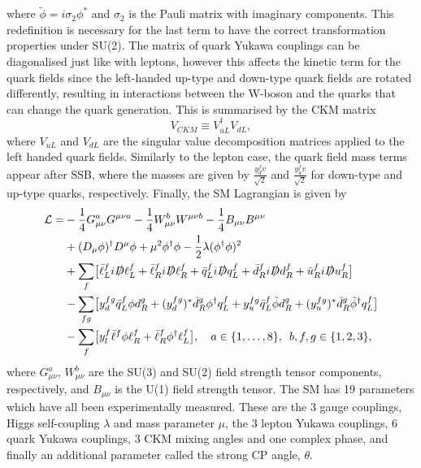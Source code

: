 where $\tilde{\phi}=i\sigma_2\phi^*$ and $
\sigma_2$ is the Pauli matrix with imaginary components. This redefinition is necessary for the last term to have the correct transformation properties under SU(2). 
The matrix of quark Yukawa couplings can be diagonalised just like with leptons, however this affects the kinetic term for the quark fields since the left-handed up-type and down-type quark fields are rotated differently, resulting in interactions between the W-boson and the quarks that can change the quark generation. This is summarised by the CKM matrix
\begin{equation}
V_{CKM}\equiv V^\dagger_{uL}V_{dL},
\end{equation}
where $V_{uL}$ and $V_{dL}$ are the singular value decomposition matrices applied to the left handed quark fields. Similarly to the lepton case, the quark field mass terms appear after SSB, where the masses are given by $\frac{y_d^fv}{\sqrt{2}}$ and $\frac{y_u^fv}{\sqrt{2}}$ for down-type and up-type quarks, respectively.
Finally, the SM Lagrangian is given by
\begin{align}
    \begin{split}
        \mathcal{L}=&-\frac{1}{4}G_{\mu\nu}^aG^{\mu\nu a}-\frac{1}{4}W_{\mu\nu}^bW^{\mu\nu b}-\frac{1}{4}B_{\mu\nu}B^{\mu\nu}\\
        &+(D_\mu\phi)^\dagger D^\mu\phi+\mu^2\phi^\dagger\phi -\frac{1}{2}\lambda(\phi^\dagger\phi)^2\\
        &+\sum_f\bigl[\bar{\ell}_L^fi\slashed{D}\ell_L^f+\bar{\ell}_R^fi\slashed{D}\ell_R^f+\bar{q}_L^fi\slashed{D}q_L^f+\bar{d}_R^fi\slashed{D}d_R^f+\bar{u}_R^fi\slashed{D}u_R^f\bigr]\\
        &-\sum_{fg}\bigl[y_d^{fg}\bar{q}{}_L^f\phi d_R^g+(y_d^{fg})^*\bar{d}{}_R^g\phi^{\dagger}q_L^f+y_u^{fg}\bar{q}{}_L^f\tilde{\phi} d_R^g+(y_u^{fg})^*\bar{d}{}_R^g\tilde{\phi}{}^{\dagger}q_L^f\bigr]\\
        &-\sum_f\bigl[y_l^f\bar{\ell}^f\phi\ell_R^f+\bar{\ell}^f_R\phi^\dagger\ell_L^f\bigr],\hspace{10pt}a\in\{1,\ldots,8\},\hspace{5pt}b,f,g\in\{1,2,3\},
    \end{split}
\end{align}
where $G^a_{\mu\nu}$, $W^b_{\mu\nu}$ are the SU(3) and SU(2) field strength tensor components, respectively, and $B_{\mu\nu}$ is the U(1) field strength tensor. The SM has 19 parameters which have all been experimentally measured. These are the 3 gauge couplings, Higgs self-coupling $\lambda$ and mass parameter $\mu$, the 3 lepton Yukawa couplings, 6 quark Yukawa couplings, 3 CKM mixing angles and one complex phase, and finally an additional parameter called the strong CP angle, $\theta$.

